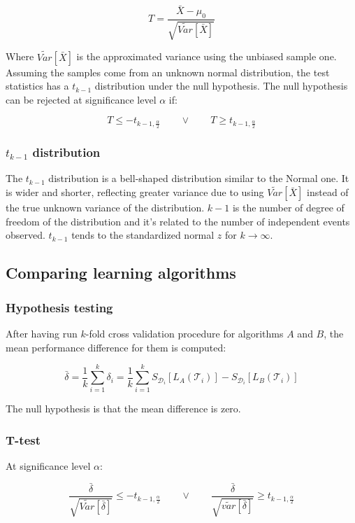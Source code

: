 	$$T = \frac{\bar{X} - \mu_0}{\sqrt{\tilde{Var}[\bar{X}]}}$$

	Where $\tilde{Var}[\bar{X}]$ is the approximated variance using the unbiased sample one.
	Assuming the samples come from an unknown normal distribution, the test statistics has a $t_{k-1}$ distribution under the null hypothesis.
	The null hypothesis can be rejected at significance level $\alpha$ if:

	$$T\le -t_{k-1,\frac{\alpha}{2}}\qquad\lor\qquad T\ge t_{k-1,\frac{\alpha}{2}}$$

		\subsubsection{$t_{k-1}$ distribution}
		The $t_{k-1}$ distribution is a bell-shaped distribution similar to the Normal one.
		It is wider and shorter, reflecting greater variance due to using $\tilde{Var}[\bar{X}]$ instead of the true unknown variance of the distribution.
		$k-1$ is the number of degree of freedom of the distribution and it's related to the number of independent events observed.
		$t_{k-1}$ tends to the standardized normal $z$ for $k\rightarrow\infty$.

	\subsection{Comparing learning algorithms}

		\subsubsection{Hypothesis testing}
		After having run $k$-fold cross validation procedure for algorithms $A$ and $B$, the mean performance difference for them is computed:

		$$\bar{\delta} = \frac{1}{k}\sum\limits_{i=1}^k\delta_i = \frac{1}{k}\sum\limits_{i=1}^k S_{\mathcal{D}_i}[L_A(\mathcal{T}_i)] - S_{\mathcal{D}_i}[L_B(\mathcal{T}_i)]$$

		The null hypothesis is that the mean difference is zero.

		\subsubsection{T-test}
		At significance level $\alpha$:

		$$\frac{\bar{\delta}}{\sqrt{\tilde{Var}[\bar{\delta}]}}\le-t_{k-1,\frac{\alpha}{2}}\qquad\lor\qquad\frac{\bar{\delta}}{\sqrt{\tilde{var}[\bar{\delta}]}}\ge t_{k-1,\frac{\alpha}{2}}$$

